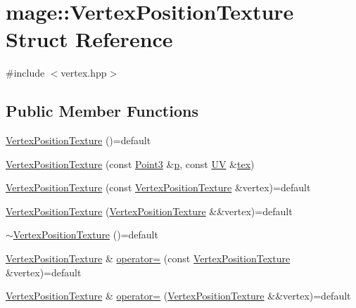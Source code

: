 \hypertarget{structmage_1_1_vertex_position_texture}{}\section{mage\+:\+:Vertex\+Position\+Texture Struct Reference}
\label{structmage_1_1_vertex_position_texture}


{\ttfamily \#include $<$vertex.\+hpp$>$}

\subsection*{Public Member Functions}
\begin{DoxyCompactItemize}
\item 
\hyperlink{structmage_1_1_vertex_position_texture_ada4dbdc6e21b7408f1bfe69d821a4b48}{Vertex\+Position\+Texture} ()=default
\item 
\hyperlink{structmage_1_1_vertex_position_texture_aa4037156fff314fb2780db6e3acaea50}{Vertex\+Position\+Texture} (const \hyperlink{structmage_1_1_point3}{Point3} \&\hyperlink{structmage_1_1_vertex_position_texture_a49253c4db52d1a4905838ba6ed6c52c6}{p}, const \hyperlink{structmage_1_1_u_v}{UV} \&\hyperlink{structmage_1_1_vertex_position_texture_a9b4efa25d268c812892ecffc2582496e}{tex})
\item 
\hyperlink{structmage_1_1_vertex_position_texture_af5f2e5beed20c22c8de29b118a5b76d5}{Vertex\+Position\+Texture} (const \hyperlink{structmage_1_1_vertex_position_texture}{Vertex\+Position\+Texture} \&vertex)=default
\item 
\hyperlink{structmage_1_1_vertex_position_texture_ae15ab647b9ed9e2c3c769b283eb00b12}{Vertex\+Position\+Texture} (\hyperlink{structmage_1_1_vertex_position_texture}{Vertex\+Position\+Texture} \&\&vertex)=default
\item 
\hyperlink{structmage_1_1_vertex_position_texture_abafd9b5ff2067834916b522d58b5764f}{$\sim$\+Vertex\+Position\+Texture} ()=default
\item 
\hyperlink{structmage_1_1_vertex_position_texture}{Vertex\+Position\+Texture} \& \hyperlink{structmage_1_1_vertex_position_texture_adae15e832eaf7624c32865a11d0d8234}{operator=} (const \hyperlink{structmage_1_1_vertex_position_texture}{Vertex\+Position\+Texture} \&vertex)=default
\item 
\hyperlink{structmage_1_1_vertex_position_texture}{Vertex\+Position\+Texture} \& \hyperlink{structmage_1_1_vertex_position_texture_abced707921e05755382566dcfa876a7a}{operator=} (\hyperlink{structmage_1_1_vertex_position_texture}{Vertex\+Position\+Texture} \&\&vertex)=default
\end{DoxyCompactItemize}
